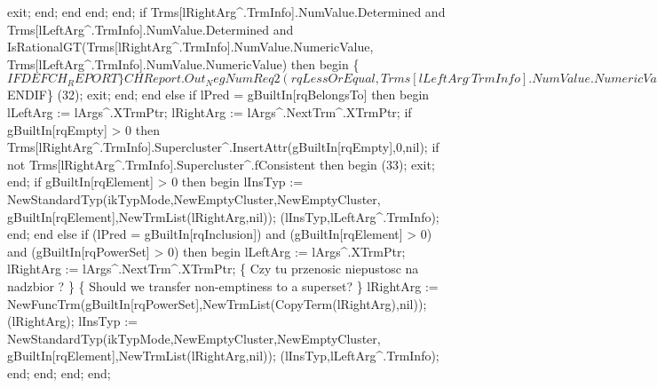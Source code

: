                            exit;
                        end;
                     end
                  end;
               end;
               if Trms[lRightArg^.TrmInfo].NumValue.Determined and
                     Trms[lLeftArg^.TrmInfo].NumValue.Determined and
                     IsRationalGT(Trms[lRightArg^.TrmInfo].NumValue.NumericValue,
                                  Trms[lLeftArg^.TrmInfo].NumValue.NumericValue) then
               begin
                  \{$IFDEF CH_REPORT\}
                  CHReport.Out_NegNumReq2(rqLessOrEqual,
                                          Trms[lLeftArg^.TrmInfo].NumValue.NumericValue,
                                          Trms[lRightArg^.TrmInfo].NumValue.NumericValue);
                  \{$ENDIF\}
                  (32);
                  exit;
               end;
            end
            else if lPred = gBuiltIn[rqBelongsTo] then
            begin
               lLeftArg := lArgs^.XTrmPtr; lRightArg := lArgs^.NextTrm^.XTrmPtr;
               if gBuiltIn[rqEmpty] > 0 then
                  Trms[lRightArg^.TrmInfo].Supercluster^.InsertAttr(gBuiltIn[rqEmpty],0,nil);
               if not Trms[lRightArg^.TrmInfo].Supercluster^.fConsistent then
               begin
                  (33);
                  exit;
               end;
               if gBuiltIn[rqElement] > 0 then
               begin
                  lInsTyp := NewStandardTyp(ikTypMode,NewEmptyCluster,NewEmptyCluster,
                                            gBuiltIn[rqElement],NewTrmList(lRightArg,nil));
                  (lInsTyp,lLeftArg^.TrmInfo);
               end;
            end
            else if (lPred = gBuiltIn[rqInclusion]) and
                       (gBuiltIn[rqElement] > 0) and (gBuiltIn[rqPowerSet] > 0)  then
            begin lLeftArg := lArgs^.XTrmPtr;
            lRightArg := lArgs^.NextTrm^.XTrmPtr;
            \{ Czy tu przenosic niepustosc na nadzbior ? \}
            \{ Should we transfer non-emptiness to a superset? \}
            lRightArg := 
               NewFuncTrm(gBuiltIn[rqPowerSet],NewTrmList(CopyTerm(lRightArg),nil));
            (lRightArg);
            lInsTyp := NewStandardTyp(ikTypMode,NewEmptyCluster,NewEmptyCluster,
                                      gBuiltIn[rqElement],NewTrmList(lRightArg,nil));
            (lInsTyp,lLeftArg^.TrmInfo);
            end;
         end;
      end;
   end;
   

